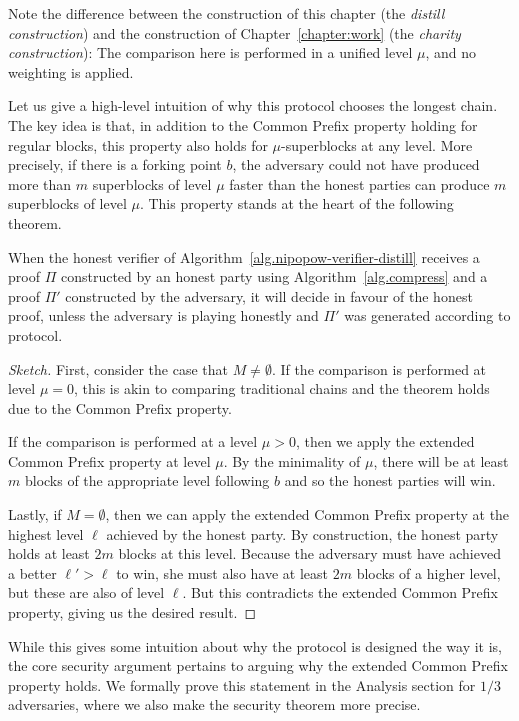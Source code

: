 Note the difference between the construction of this chapter (the \emph{distill
construction}) and the construction of Chapter~\ref{chapter:work} (the
\emph{charity construction}): The comparison here is performed in a unified
level $\mu$, and no weighting is applied.

Let us give a high-level intuition of why this protocol chooses the longest chain.
The key idea is that, in addition to the Common Prefix property holding for
regular blocks, this property also holds for $\mu$-superblocks at any level.
More precisely, if there is a forking point $b$, the adversary could not have
produced more than $m$ superblocks of level $\mu$ faster than the honest parties
can produce $m$ superblocks of level $\mu$. This property stands at the heart
of the following theorem.

\begin{theorem}[Security]
  When the honest verifier of Algorithm~\ref{alg.nipopow-verifier-distill} receives
  a proof $\Pi$ constructed by an honest party using Algorithm~\ref{alg.compress}
  and a proof $\Pi'$ constructed by the adversary, it will decide in favour
  of the honest proof, unless the adversary is playing honestly and $\Pi'$
  was generated according to protocol.
\end{theorem}
\begin{proof}[Sketch]
  First, consider the case that $M \neq \emptyset$.
  If the comparison is performed at level $\mu = 0$, this is akin to comparing
  traditional chains and the theorem holds due to the Common Prefix property.

  If the comparison is performed at a level $\mu > 0$, then we apply the extended
  Common Prefix property at level $\mu$. By the minimality of $\mu$, there will be at least
  $m$ blocks of the appropriate level following $b$ and so the honest parties will
  win.

  Lastly, if $M = \emptyset$, then we can apply the extended Common Prefix property
  at the highest level $\ell$ achieved by the honest party. By construction, the
  honest party holds at least $2m$ blocks at this level. Because the adversary
  must have achieved a better $\ell' > \ell$ to win, she must also have at least
  $2m$ blocks of a higher level, but these are also of level $\ell$. But this contradicts
  the extended Common Prefix property, giving us the desired result.
\end{proof}

While this gives some intuition about why the protocol is designed the way it is,
the core security argument pertains to arguing why the extended Common Prefix property
holds. We formally prove this statement in the Analysis section for $1/3$ adversaries,
where we also make the security theorem more precise.
